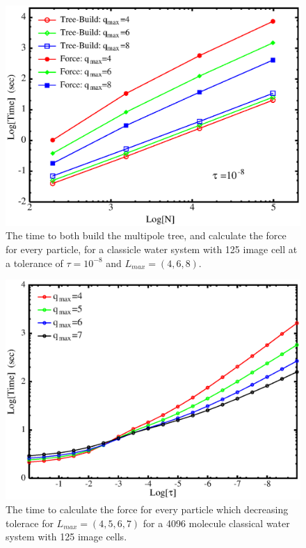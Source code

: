 \documentclass[prb,aps,nobibnotes,superbib,preprint]{revtex4}
\begin{document}
\begin{figure}
\caption{The time to both build the multipole tree, and calculate the force for every particle, for 
a classicle water system  with 125 image cell at a tolerance of $\tau=10^{-8}$ and $L_{max}=(4,6,8)$.}
{\centering \includegraphics {Time_vs_N_water_2.ps} \par} 
\label{figure:TimeVsNwater} 
\end{figure}

\begin{figure}
\caption{The time to calculate the force for every particle which decreasing tolerace for  $L_{max}=(4,5,6,7)$ for
a 4096 molecule  classical water system with 125 image cells.}
{\centering \includegraphics {Time_vs_Tau_W4096.ps} \par} 
\label{figure:TimeVsTauWater4096} 
\end{figure}
\end{document}
